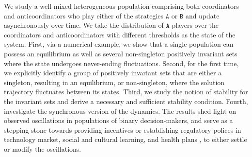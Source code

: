 \documentclass[10 pt,twocolumn,journal]{IEEEtran}
\theoremstyle{plain}
\newcommand{\A}{\mathcal{A}}
\newcommand{\p}{\tb{p}}
\newcommand{\pp}{\tb{p'}}
\newcommand{\q}{\tr{q}}
\newcommand{\qq}{\tr{q'}}
\renewcommand{\A}{\mathtt{A}}
\newcommand{\B}{\mathtt{B}}
\newcommand{\tb}{\textcolor{blue}}
\newcommand{\tr}{\textcolor{Myred}}
\theoremstyle{definition}
\begin{document}
We study a well-mixed heterogeneous population comprising both coordinators and anticoordinators who play either of the strategies $\A$ or $\B$ and update asynchronously over time.
We take the distribution of $\A$-players over the coordinators and anticoordinators with different thresholds as the state of the system.
First, via a numerical example, we show that a single population can possess an equilibrium as well as several non-singleton positively invariant sets where the state undergoes never-ending fluctuations.
Second, for the first time, we explicitly identify a group of positively invariant sets that are either a singleton, resulting in an equilibrium, or non-singleton, where the solution trajectory fluctuates between its states. 
Third, we study the notion of stability for the invariant sets and derive a necessary and sufficient stability condition.
Fourth, investigate the synchronous version of the dynamics.
The results shed light on observed oscillations in populations of binary decision-makers, and serve as a stepping stone towards providing incentives or establishing regulatory polices in technology market, social and cultural learning, and health plans \cite{bodine2013, legare2015, sato2016}, to either settle or modify the oscillations. 

\end{document}
